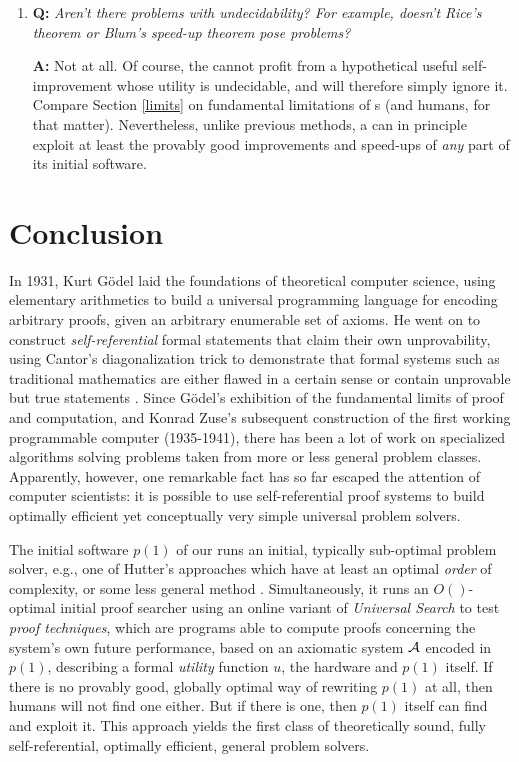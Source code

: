 \begin{enumerate}
\item
{\bf Q:} {\em 
Aren't there problems with undecidability? For example,
doesn't Rice's theorem \cite{Rice:53} 
or Blum's speed-up theorem \cite{Blum:67,Blum:71}
pose problems?
}

{\bf A:} Not at all.  Of course, the \gm cannot profit
from a hypothetical useful self-improvement whose utility is undecidable,
and will therefore simply ignore it. Compare Section 
\ref{limits} on fundamental
limitations of \gmn s (and humans, for that matter).
Nevertheless, unlike previous methods, a \gm can in principle
exploit at least the provably good improvements and speed-ups of 
{\em any} part of its initial software.

\end{enumerate}


\section{Conclusion}
\label{conclusion}

In 1931, Kurt G\"{o}del laid the foundations of theoretical
computer science, using
elementary arithmetics to build a universal programming language
for encoding arbitrary proofs, given an arbitrary enumerable set of
axioms.  He went on to construct {\em
self-referential} formal statements that claim their own unprovability,
using Cantor's diagonalization trick \cite{Cantor:1874}
to demonstrate that formal systems such as
traditional mathematics are either flawed in a certain
sense or contain unprovable but true statements \cite{Goedel:31}.
Since G\"{o}del's exhibition of the fundamental limits of proof and
computation, and Konrad Zuse's subsequent construction of the first working
programmable computer (1935-1941),
there has been a lot of work on specialized algorithms
solving problems taken from more or less general problem classes.
Apparently, however,
one remarkable fact has so far escaped the attention of computer
scientists: it is possible to use self-referential proof systems to
build optimally efficient yet conceptually very simple
universal problem solvers.

The initial software $p(1)$ of our \gm
runs an initial, typically sub-optimal problem solver, e.g., one of
Hutter's approaches 
\cite{Hutter:01aixi+,Hutter:01fast+}
which have at least an optimal {\em order} of complexity,
or some less general method  \cite{Kaelbling:96}.
Simultaneously, it runs an $O()$-optimal initial proof 
searcher using an online variant of {\em Universal Search}
to test {\em proof techniques}, which are 
programs able to compute proofs
concerning the system's own future performance,
based on an axiomatic system $\cal A$ 
encoded in $p(1)$,
describing a formal {\em utility} function $u$,
the hardware and $p(1)$ itself. 
If there is no provably good, globally optimal 
way of rewriting $p(1)$ at all, then humans
will not find one either. But if there is one,
then $p(1)$ itself can find 
and exploit it. This approach yields the first
class of theoretically sound, fully self-referential,
optimally efficient, general problem solvers.

